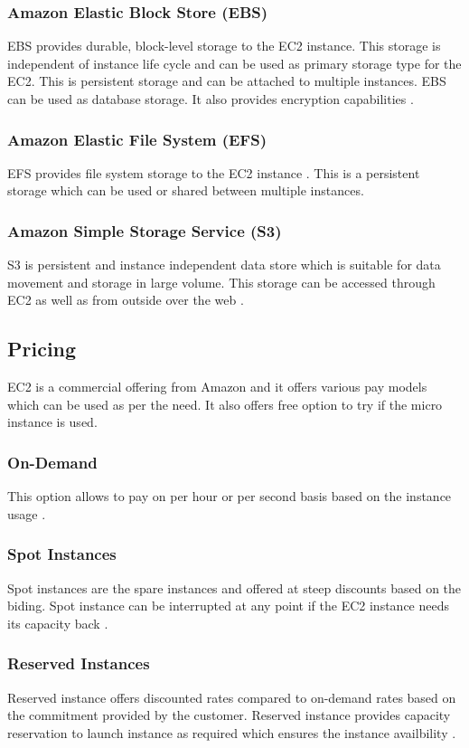 \subsubsection{Amazon Elastic Block Store (EBS)} 
EBS provides durable, block-level storage to the EC2 instance. This storage is independent of instance life cycle and can be used as primary storage type for the EC2. This is persistent storage and can be attached to multiple instances. EBS can be used as database storage. It also provides encryption capabilities \cite{www-aws-ec2Storage}.
\subsubsection{Amazon Elastic File System (EFS)} 
EFS provides file system storage to the EC2 instance \cite{www-aws-ec2Storage}. This is a persistent storage which can be used or shared between multiple instances.
\subsubsection{Amazon Simple Storage Service (S3)} 
S3 is persistent and instance independent data store which is suitable for data movement and storage in large volume. This storage can be accessed through EC2 as well as from outside over the web \cite{www-aws-ec2Storage}. 

\subsection{Pricing}
EC2 is a commercial offering from Amazon and it offers various pay models which can be used as per the need. It also offers free option to try if the micro instance is used.
\subsubsection{On-Demand} 
This option allows to pay on per hour or per second basis based on the instance usage \cite{www-aws-ec2Pricing}.
\subsubsection{Spot Instances} 
Spot instances are the spare instances and offered at steep discounts based on the biding. Spot instance can be interrupted at any point if the EC2 instance needs its capacity back \cite{www-aws-ec2Pricing}.
\subsubsection{Reserved Instances} 
Reserved instance offers discounted rates compared to on-demand rates based on the commitment provided by the customer. Reserved instance provides capacity reservation to launch instance as required which ensures the instance availbility \cite{www-aws-ec2Pricing}.
